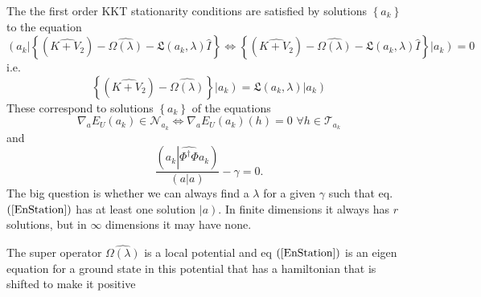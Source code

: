 \documentclass[aps,preprint]{revtex4}%
\begin{document}
The the first order KKT stationarity conditions are satisfied by solutions
$\left\{  a_{k}\right\}  $ to the equation
\begin{equation}
\left(  \overset{}{a_{k}}\right\vert \left\{  \left(  \widehat{K+V_{2}%
}\right)  -\widehat{\Omega\left(  \lambda\right)  }-\mathfrak{L}\left(
a_{k},\lambda\right)  \hat{I}\right\}  \Leftrightarrow\left\{  \left(
\widehat{K+V_{2}}\right)  -\widehat{\Omega\left(  \lambda\right)
}-\mathfrak{L}\left(  a_{k},\lambda\right)  \hat{I}\right\}  \left\vert
\overset{}{a_{k}}\right)  =0
\end{equation}
i.e.
\begin{equation}
\left\{  \left(  \widehat{K+V_{2}}\right)  -\widehat{\Omega\left(
\lambda\right)  }\right\}  \left\vert \overset{}{a_{k}}\right)  =\mathfrak{L}%
\left(  a_{k},\lambda\right)  \left\vert \overset{}{a_{k}}\right)
\end{equation}
These correspond to solutions $\left\{  a_{k}\right\}  $ of the equations
\begin{equation}
\nabla_{a}E_{U}\left(  a_{k}\right)  \in\mathcal{N}_{a_{k}}\Leftrightarrow
\nabla_{a}E_{U}\left(  a_{k}\right)  \left(  h\right)  =0\,\,\forall
h\in\mathcal{T}_{a_{k}}%
\end{equation}
and
\begin{equation}
\frac{\left(  a_{k}\left\vert \widehat{\Phi^{\dagger}\Phi}\right.
a_{k}\right)  }{\left(  a\left\vert \overset{}{a}\right.  \right)  }-\gamma=0.
\label{surface}%
\end{equation}
The big question is whether we can always find a $\lambda$ for a given
$\gamma$ such that eq. $\left(  \ref{EnStation}\right)  $ has at least one
solution $\left\vert \overset{}{a}\right)  .$ In finite dimensions it always
has $r$ solutions, but in $\infty$ dimensions it may have none.

The super operator $\widehat{\Omega\left(  \lambda\right)  }$ is a local
potential and eq $\left(  \ref{EnStation}\right)  $ is an eigen equation for a
ground state in this potential that has a hamiltonian that is shifted to make
it positive
\end{document}
